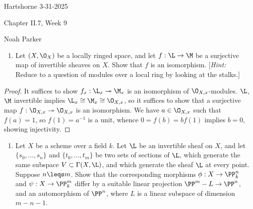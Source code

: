 \documentclass[12pt]{amsart}
\begin{document}
{Hartshorne} \hfill {3-31-2025}

\bigskip\bigskip

\begin{center}

{\sc Chapter II.7, Week 9}

\end{center}

\begin{center}

  {Noah Parker} %
    
\end{center}

\bigskip\bigskip

\begin{enumerate}
  \item[7.1.] {
      Let $(X,\O_X)$ be a locally ringed space, and let $f:\L\to \M$ be a surjective map of invertible sheaves on $X$.
      Show that $f$ is an isomorphism.
      [\emph{Hint:} Reduce to a question of modules over a local ring by looking at the stalks.]
    }
\end{enumerate}

\begin{proof}
  It suffices to show $f_x:\L_x\twoheadrightarrow \M_x$ is an isomorphism of $\O_{X,x}$-modules.
  $\L$, $\M$ invertible implies $\L_x\cong \M_x\cong \O_{X,x}$, so it suffices to show that a surjective map $f:\O_{X,x}\twoheadrightarrow\O_{X,x}$ is an isomorphism.
  We have $a\in \O_{X,x}$ such that $f(a) = 1$, so $f(1)=a^{-1}$ is a unit, whence $0=f(b)=bf(1)$ implies $b=0$, showing injectivity.
\end{proof}

\begin{enumerate}
  \item[7.2.] {
      Let $X$ be a scheme over a field $k$.
      Let $\L$ be an invertible sheaf on $X$, and let $\{s_0,\ldots,s_n\}$ and $\{t_0,\ldots,t_m\}$ be two sets of sections of $\L$, which generate the same subspace $V\subset \Gamma(X,\L)$, and which generate the sheaf $\L$ at every point.
      Suppose $n\leqs m$.
      Show that the corresponding morphisms $\phi:X\to \PP^n_k$ and $\psi:X\to \PP^m_k$ differ by a suitable linear projection $\PP^m-L\to \PP^n$, and an automorphism of $\PP^n$, where $L$ is a linear subspace of dimension $m-n-1$.
    }
\end{enumerate}
% 
\end{document}
